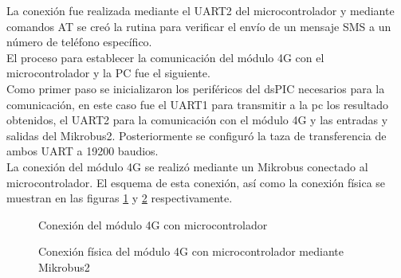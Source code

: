 La conexión fue realizada mediante el UART2 del microcontrolador y mediante comandos AT se creó la rutina para verificar el envío de un mensaje SMS a un número de teléfono específico.\\

El proceso para establecer la comunicación del módulo 4G con el microcontrolador y la PC fue el siguiente.\\

Como primer paso se inicializaron los periféricos del dsPIC necesarios para la comunicación, en este caso fue el UART1 para transmitir a la pc los resultado obtenidos, el UART2 para la comunicación con el módulo 4G y las entradas y salidas del Mikrobus2. Posteriormente se configuró la taza de transferencia de ambos UART a 19200 baudios.\\

La conexión del módulo 4G se realizó mediante un Mikrobus conectado al microcontrolador. El esquema de esta conexión, así como la conexión física se muestran en las figuras \ref{fig:ConexionGSM} y \ref{fig:ConexionFisicaGSM} respectivamente.\\

	\begin{figure}[htbp!]
		\centering
		\caption{Conexión del módulo 4G con microcontrolador}
		\label{fig:ConexionGSM}
	\end{figure}
	
	\begin{figure}[htbp!]
		\centering
		\caption{Conexión física del módulo 4G con microcontrolador mediante Mikrobus2}
		\label{fig:ConexionFisicaGSM}
	\end{figure}
	
